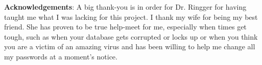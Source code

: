 \textbf{Acknowledgements}:
\label{acknowledgements}
A big thank-you is in order for Dr. Ringger for having taught me what I was lacking for this project. I thank my wife for being my best friend. She has proven to be true help-meet for me, especially when times get tough, such as when your database gets corrupted or locks up or when you think you are a victim of an amazing virus and has been willing to help me change all my passwords at a moment's notice.
